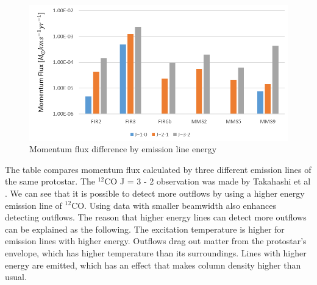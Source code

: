 \documentclass[twoside,11pt]{gshs_thesis}
\begin{document}
\begin{figure}[h!]
	\centering
	\includegraphics[width=\textwidth]{J.PNG}
	\caption{Momentum flux difference by emission line energy}
\end{figure}

The table compares momentum flux calculated by three different emission lines of the same protostar. The $^{12}$CO J = 3 - 2 observation was made by Takahashi et al \cite{Takahashi}. We can see that it is possible to detect more outflows by using a higher energy emission line of $^{12}$CO. Using data with smaller beamwidth also enhances detecting outflows. The reason that higher energy lines can detect more outflows can be explained as the following. The excitation temperature is higher for emission lines with higher energy. Outflows drag out matter from the protostar's envelope, which has higher temperature than its surroundings. Lines with higher energy are emitted, which has an effect that makes column density higher than usual.

\newpage
\end{document}
